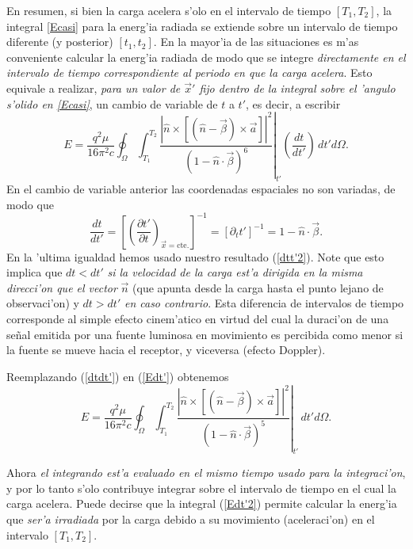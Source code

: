 En resumen, si bien la carga acelera s'olo en el intervalo de tiempo $[T_1,T_2]$, la integral \eqref{Ecasi} para la energ'ia radiada se extiende sobre un intervalo de tiempo diferente (y posterior) $[t_1,t_2]$. En la mayor'ia de las situaciones es m'as conveniente calcular la energ'ia radiada de modo que se integre \textit{directamente en el intervalo de tiempo correspondiente al periodo en que la carga acelera}. Esto equivale a realizar, \textit{para un valor de $\vec{x}'$ fijo dentro de la integral sobre el 'angulo s'olido en \eqref{Ecasi}},  un cambio de variable de $t$ a $t'$, es decir, a escribir
\begin{equation}
 E=\frac{q^2\mu}{16\pi^2 c}\oint_\Omega\int_{T_1}^{T_2}\left.\frac{\left|\hat{n}\times
\left[ \left( \hat{n}-\vec{\beta}\right)\times{\vec{a}}\right]\right|^2}{\left(
1-\hat{n}\cdot\vec{\beta}\right) ^{6}}\right|_{t'}\left(\frac{dt}{dt'}\right)\,dt'd\Omega .\label{Edt'}
\end{equation}
En el cambio de variable anterior las coordenadas espaciales no son variadas, de modo que
\begin{equation}
\frac{dt}{dt'}=\left[\left(\frac{\partial t'}{\partial t}\right)_{\vec{x}=\text{cte.}}\right]^{-1}
=\left[\partial_t t'\right]^{-1}=1-\hat{n}\cdot\vec{\beta}. \label{dtdt'}
\end{equation}
En la 'ultima igualdad hemos usado nuestro resultado (\ref{dtt'2}). Note que esto implica que $dt<dt'$ \textit{si la velocidad de la carga est'a dirigida en la misma direcci'on que el vector} $\vec{n}$ (que apunta desde la carga hasta el punto lejano de observaci'on) y $dt>dt'$ \textit{en caso contrario}. Esta diferencia de intervalos de tiempo corresponde al simple efecto cinem'atico en virtud del cual  la duraci'on de una señal emitida por una fuente luminosa en movimiento es percibida como menor si la fuente se mueve hacia el receptor, y viceversa (efecto Doppler).

Reemplazando (\ref{dtdt'}) en (\ref{Edt'}) obtenemos
\begin{equation}
 E=\frac{q^2\mu}{16\pi^2 c}\oint_\Omega\int_{T_1}^{T_2}\left.\frac{\left|\hat{n}\times\left[ \left( \hat{n}-\vec{\beta}\right)\times{\vec{a}}\right]\right|^2}{\left(1-\hat{n}\cdot\vec{\beta}\right)^5}\right|_{t'}\,dt'd\Omega .\label{Edt'2}
\end{equation}

Ahora \textit{el integrando est'a evaluado en el mismo tiempo usado para la integraci'on}, y por lo tanto s'olo contribuye integrar sobre el intervalo de tiempo en el cual la carga acelera. Puede decirse que la integral (\ref{Edt'2}) permite calcular la energ'ia que \textit{ser'a irradiada} por la carga debido a su movimiento (aceleraci'on) en el intervalo $[T_1,T_2]$.

